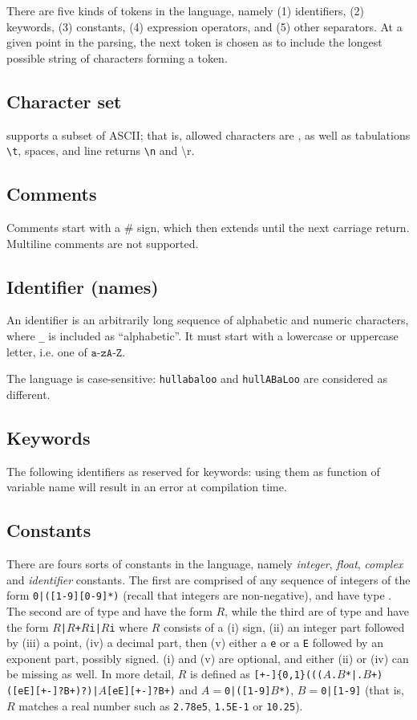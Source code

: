 There are five kinds of tokens in the language, namely \textsf{(1)} identifiers, \textsf{(2)} keywords, \textsf{(3)} constants, \textsf{(4)} expression operators, and \textsf{(5)} other separators. At a given point in the parsing, the next token is chosen as to include the longest possible string of characters forming a token.

\subsection{Character set}
\QL supports a subset of ASCII; that is, allowed characters are
, as well as tabulations \texttt{\textbackslash{}t}, spaces, and line returns \texttt{\textbackslash{}n} and {\textbackslash{}r}.
\subsection{Comments}
Comments start with a \# sign, which then extends until the next carriage return. Multiline comments are not supported.

\subsection{Identifier (names)}
An identifier is an arbitrarily long sequence of alphabetic and numeric characters, where \texttt{\_} is included as ``alphabetic''. It must start with a lowercase or uppercase letter, i.e. one of $\texttt{a-zA-Z}$.

\noindent The language is case-sensitive: \texttt{hullabaloo} and \texttt{hullABaLoo} are considered as different.

\subsection{Keywords}
The following identifiers as reserved for keywords: using them as function of variable name will result in an error at compilation time.

\subsection{Constants}
There are fours sorts of constants in the language, namely \emph{integer}, \emph{float}, \emph{complex} and \emph{identifier} constants. The first are comprised of any sequence of integers of the form \texttt{0|([1-9][0-9]*)} (recall that integers are non-negative), and have type \integ. The second are of type \float  and have the form \texttt{$R$}, while the third are of type \complex and have the form 
\texttt{$R$|$R$+$R$i|$R$i}
where $R$ consists of a \textsf{(i)} sign, \textsf{(ii)} an integer part followed by \textsf{(iii)} a point, \textsf{(iv)} a decimal part, then  \textsf{(v)} either a \texttt{e} or a \texttt{E} followed by an exponent part, possibly signed. \textsf{(i)} and \textsf{(v)} are optional, and either \textsf{(ii)} or \textsf{(iv)} can be missing as well. In more detail, $R$ 
is defined as \texttt{[+-]\{0,1\}((($A$.$B$*|.$B$+)([eE][+-]?B+)?)|$A$[eE][+-]?B+)} and $A=$\texttt{0|([1-9]$B$*)}, $B=$\texttt{0|[1-9]} (that is, $R$ matches a real number such as \texttt{2.78e5}, \texttt{1.5E-1} or \texttt{10.25}).

